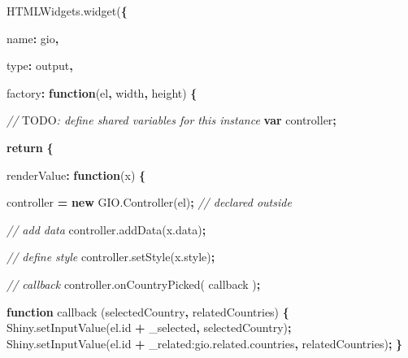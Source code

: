 \documentclass[
]{krantz}
\makeatletter
\newenvironment{Shaded}{\begin{snugshade}}{\end{snugshade}}
\newcommand{\AlertTok}[1]{\textcolor[rgb]{0.33,0.33,0.33}{#1}}
\newcommand{\AttributeTok}[1]{\textcolor[rgb]{0.61,0.61,0.61}{#1}}
\newcommand{\CommentTok}[1]{\textcolor[rgb]{0.37,0.37,0.37}{\textit{#1}}}
\newcommand{\ControlFlowTok}[1]{\textcolor[rgb]{0.27,0.27,0.27}{\textbf{#1}}}
\newcommand{\DataTypeTok}[1]{\textcolor[rgb]{0.27,0.27,0.27}{#1}}
\newcommand{\KeywordTok}[1]{\textcolor[rgb]{0.27,0.27,0.27}{\textbf{#1}}}
\newcommand{\NormalTok}[1]{#1}
\newcommand{\OperatorTok}[1]{\textcolor[rgb]{0.43,0.43,0.43}{\textbf{#1}}}
\newcommand{\StringTok}[1]{\textcolor[rgb]{0.5,0.5,0.5}{#1}}
\newcommand{\VariableTok}[1]{\textcolor[rgb]{0,0,0}{#1}}
\newenvironment{kframe}{%
\medskip{}
\setlength{\fboxsep}{.8em}
 \def\at@end@of@kframe{}%
 \ifinner\ifhmode%
  \def\at@end@of@kframe{\end{minipage}}%
  \begin{minipage}{\columnwidth}%
 \fi\fi%
 \def\FrameCommand##1{\hskip\@totalleftmargin \hskip-\fboxsep
 \colorbox{shadecolor}{##1}\hskip-\fboxsep
     \hskip-\linewidth \hskip-\@totalleftmargin \hskip\columnwidth}%
 \MakeFramed {\advance\hsize-\width
   \@totalleftmargin\z@ \linewidth\hsize
   \@setminipage}}%
 {\par\unskip\endMakeFramed%
 \at@end@of@kframe}
\renewenvironment{Shaded}{\begin{kframe}}{\end{kframe}}
\makeatother
\begin{document}
\begin{Shaded}
\begin{Highlighting}[]
\VariableTok{HTMLWidgets}\NormalTok{.}\AttributeTok{widget}\NormalTok{(}\OperatorTok{\{}

  \DataTypeTok{name}\OperatorTok{:} \StringTok{\textquotesingle{}gio\textquotesingle{}}\OperatorTok{,}

  \DataTypeTok{type}\OperatorTok{:} \StringTok{\textquotesingle{}output\textquotesingle{}}\OperatorTok{,}

  \DataTypeTok{factory}\OperatorTok{:} \KeywordTok{function}\NormalTok{(el}\OperatorTok{,}\NormalTok{ width}\OperatorTok{,}\NormalTok{ height) }\OperatorTok{\{}

    \CommentTok{// }\AlertTok{TODO}\CommentTok{: define shared variables for this instance}
    \KeywordTok{var}\NormalTok{ controller}\OperatorTok{;}

    \ControlFlowTok{return} \OperatorTok{\{}

      \DataTypeTok{renderValue}\OperatorTok{:} \KeywordTok{function}\NormalTok{(x) }\OperatorTok{\{}

\NormalTok{        controller }\OperatorTok{=} \KeywordTok{new} \VariableTok{GIO}\NormalTok{.}\AttributeTok{Controller}\NormalTok{(el)}\OperatorTok{;} \CommentTok{// declared outside}
        
        \CommentTok{// add data}
        \VariableTok{controller}\NormalTok{.}\AttributeTok{addData}\NormalTok{(}\VariableTok{x}\NormalTok{.}\AttributeTok{data}\NormalTok{)}\OperatorTok{;}

        \CommentTok{// define style}
        \VariableTok{controller}\NormalTok{.}\AttributeTok{setStyle}\NormalTok{(}\VariableTok{x}\NormalTok{.}\AttributeTok{style}\NormalTok{)}\OperatorTok{;}

        \CommentTok{// callback}
        \VariableTok{controller}\NormalTok{.}\AttributeTok{onCountryPicked}\NormalTok{( callback )}\OperatorTok{;}

        \KeywordTok{function} \AttributeTok{callback}\NormalTok{ (selectedCountry}\OperatorTok{,}\NormalTok{ relatedCountries) }\OperatorTok{\{}
          \VariableTok{Shiny}\NormalTok{.}\AttributeTok{setInputValue}\NormalTok{(}\VariableTok{el}\NormalTok{.}\AttributeTok{id} \OperatorTok{+} \StringTok{\textquotesingle{}\_selected\textquotesingle{}}\OperatorTok{,}\NormalTok{ selectedCountry)}\OperatorTok{;}
          \VariableTok{Shiny}\NormalTok{.}\AttributeTok{setInputValue}\NormalTok{(}\VariableTok{el}\NormalTok{.}\AttributeTok{id} \OperatorTok{+} \StringTok{\textquotesingle{}\_related:gio.related.countries\textquotesingle{}}\OperatorTok{,}\NormalTok{ relatedCountries)}\OperatorTok{;}
        \OperatorTok{\}}


\end{Highlighting}
\end{Shaded}
\end{document}
